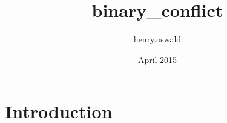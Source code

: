 \documentclass{article}
\title{binary_conflict}
\author{henry.oswald }
\date{April 2015}
\begin{document}
\maketitle

\section{Introduction}
\end{document}
